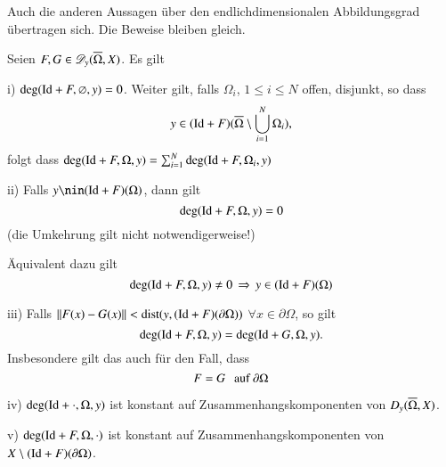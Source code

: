Auch die anderen Aussagen über den endlichdimensionalen Abbildungsgrad übertragen sich.
Die Beweise bleiben gleich.

\begin{theorem}\label{3.11}
    Seien $F,G\in \mathscr D_y(\overline\Omega,X)$. Es gilt
    \begin{description}
        \item{i)}
        $\deg(\mathrm{Id}+F,\varnothing,y)=0$. Weiter gilt, falls $\Omega_i$, $1\leq i\leq N$ offen, disjunkt,
        so dass
        \[
            y\in (\mathrm{Id}+F)(\overline\Omega\setminus\bigcup_{i=1}^N\Omega_i),
        \]
        folgt dass $\deg(\mathrm{Id}+F,\Omega,y)=\sum_{i=1}^N \deg(\mathrm{Id}+F,\Omega_i,y)$
        \item{ii)}
        Falls $y\nin (\Id+F)(\Omega)$, dann gilt
        \[
            \deg(\mathrm{Id}+F,\Omega,y)=0
        \]
        (die Umkehrung gilt nicht notwendigerweise!)

        Äquivalent dazu gilt
        \[
            \deg(\mathrm{Id}+F,\Omega,y)\neq 0 \, \Rightarrow \, y\in (\mathrm{Id}+F)(\Omega)
        \]
        \item{iii)}
        Falls $\|F(x)-G(x)\|<\mathrm{dist}(y,(\mathrm{Id}+F)(\partial\Omega))$ $\forall x\in \partial \Omega$, so gilt
        \[
            \deg(\mathrm{Id}+F,\Omega,y)=\deg(\mathrm{Id}+G,\Omega,y).
        \]
        Insbesondere gilt das auch für den Fall, dass
        \[
            F=G\hspace{.25cm} \text{auf } \partial \Omega
        \]
        \item{iv)}
        $\deg(\mathrm{Id}+\cdot,\Omega,y)$ ist konstant auf Zusammenhangskomponenten von $D_y(\overline\Omega,X)$.
        \item{v)}
        $\deg(\mathrm{Id}+F,\Omega,\cdot)$ ist konstant auf Zusammenhangskomponenten von $X\setminus 
        (\mathrm{Id}+F)(\partial \Omega)$.
    \end{description}
\end{theorem}
